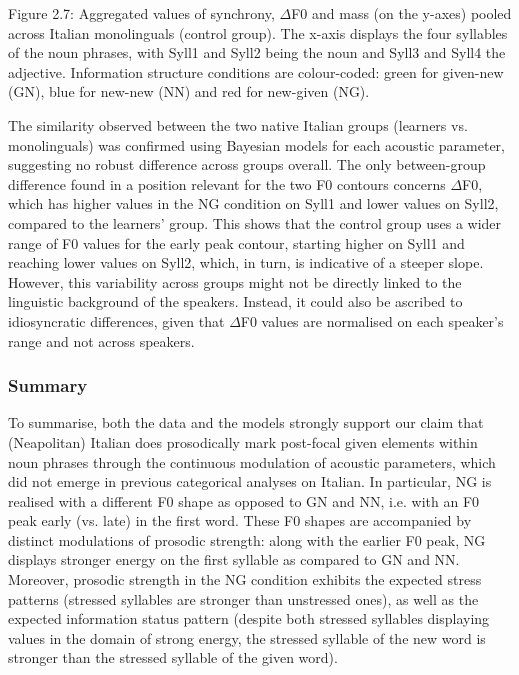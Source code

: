 \begin{stylecaption}
Figure 2.7: Aggregated values of synchrony, ${\Delta}$F0 and mass (on the y-axes) pooled across Italian monolinguals (control group). The x-axis displays the four syllables of the noun phrases, with Syll1 and Syll2 being the noun and Syll3 and Syll4 the adjective. Information structure conditions are colour-coded: green for given-new (GN), blue for new-new (NN) and red for new-given (NG). 
\end{stylecaption}

\begin{styleStandard}
The similarity observed between the two native Italian groups (learners vs. monolinguals) was confirmed using Bayesian models for each acoustic parameter, suggesting no robust difference across groups overall. The only between-group difference found in a position relevant for the two F0 contours concerns ${\Delta}$F0, which has higher values in the NG condition on Syll1 and lower values on Syll2, compared to the learners’ group. This shows that the control group uses a wider range of F0 values for the early peak contour, starting higher on Syll1 and reaching lower values on Syll2, which, in turn, is indicative of a steeper slope. However, this variability across groups might not be directly linked to the linguistic background of the speakers. Instead, it could also be ascribed to idiosyncratic differences, given that ${\Delta}$F0 values are normalised on each speaker’s range and not across speakers.
\end{styleStandard}

\subsubsection[Summary]{Summary}
\hypertarget{Toc191305899}{}\begin{styleStandard}
To summarise, both the data and the models strongly support our claim that (Neapolitan) Italian does prosodically mark post-focal given elements within noun phrases through the continuous modulation of acoustic parameters, which did not emerge in previous categorical analyses on Italian. In particular, NG is realised with a different F0 shape as opposed to GN and NN, i.e. with an F0 peak early (vs. late) in the first word. These F0 shapes are accompanied by distinct modulations of prosodic strength: along with the earlier F0 peak, NG displays stronger energy on the first syllable as compared to GN and NN. Moreover, prosodic strength in the NG condition exhibits the expected stress patterns (stressed syllables are stronger than unstressed ones), as well as the expected information status pattern (despite both stressed syllables displaying values in the domain of strong energy, the stressed syllable of the new word is stronger than the stressed syllable of the given word).
\end{styleStandard}

